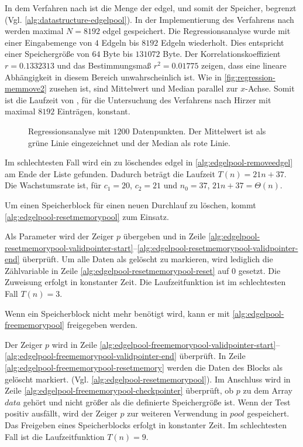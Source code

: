 In dem Verfahren nach \citeauthor{hirzer08} ist die Menge der \gls{edgel}, und somit der Speicher, begrenzt
 (Vgl. \autoref{alg:datastructure-edgelpool}). In der Implementierung des Verfahrens nach \citeauthor{hirzer08} werden
 maximal $N = 8192$ \gls{edgel} gespeichert. Die Regressionsanalyse wurde mit einer Eingabemenge von $4$ Edgeln
 bis $8192$ Edgeln wiederholt. Dies entspricht einer Speichergröße von $64$ Byte bis $131072$ Byte. Der
 Korrelationskoeffizient $r = 0.1332313$ und das Bestimmungsmaß $r^2 = 0.01775$ zeigen, dass eine lineare Abhängigkeit
 in diesem Bereich unwahrscheinlich ist. Wie in \autoref{fig:regression-memmove2} zusehen ist, sind Mittelwert und
 Median parallel zur $x$-Achse. Somit ist die Laufzeit von , für die Untersuchung des Verfahrens nach
 Hirzer mit maximal $8192$ Einträgen, konstant.
\begin{figure}[!ht]
	\centering
	
	\caption{Regressionsanalyse mit $1200$ Datenpunkten. Der Mittelwert ist als grüne Linie eingezeichnet und der
	 Median als rote Linie.}
	\label{fig:regression-memmove2}
\end{figure}
Im schlechtesten Fall wird ein zu löschendes \gls{edgel} in \autoref{alg:edgelpool-removeedgel} am Ende der Liste
 gefunden. Dadurch beträgt die Laufzeit $T(n) = 21n + 37$. Die Wachstumsrate ist, für $c_{1} = 20$, $c_{2} = 21$ und
 $n_{0} = 37$, $21n + 37= \Theta(n)$.

Um einen Speicherblock für einen neuen Durchlauf zu löschen, kommt \autoref{alg:edgelpool-resetmemorypool} zum Einsatz.

 Als Parameter wird der Zeiger $p$ übergeben und in Zeile
 \ref{alg:edgelpool-resetmemorypool-validpointer-start}--\ref{alg:edgelpool-resetmemorypool-validpointer-end}
 überprüft. Um alle Daten als gelöscht zu markieren, wird lediglich die Zählvariable in Zeile
 \ref{alg:edgelpool-resetmemorypool-reset} auf $0$ gesetzt. Die Zuweisung erfolgt in konstanter Zeit. Die
 Laufzeitfunktion ist im schlechtesten Fall $T(n) = 3$.

Wenn ein Speicherblock nicht mehr benötigt wird, kann er mit \autoref{alg:edgelpool-freememorypool} freigegeben werden.

 Der Zeiger $p$ wird in Zeile
 \ref{alg:edgelpool-freememorypool-validpointer-start}--\ref{alg:edgelpool-freememorypool-validpointer-end} überprüft.
 In Zeile \ref{alg:edgelpool-freememorypool-resetmemory} werden die Daten des Blocks als gelöscht markiert.
 (Vgl. \autoref{alg:edgelpool-resetmemorypool}). Im Anschluss wird in Zeile
 \ref{alg:edgelpool-freememorypool-checkpointer} überprüft, ob $p$ zu dem Array $\mathit{data}$ gehört und nicht größer
 als die definierte Speichergröße ist. Wenn der Test positiv ausfällt, wird der Zeiger $p$ zur weiteren Verwendung in
 $\mathit{pool}$ gespeichert. Das Freigeben eines Speicherblocks erfolgt in konstanter Zeit. Im schlechtesten Fall ist
 die Laufzeitfunktion $T(n) = 9$.

